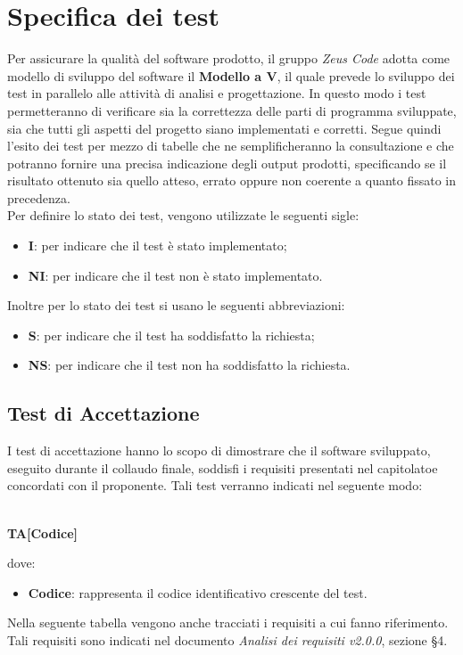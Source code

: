 \section{Specifica dei test}
Per assicurare la qualità del software prodotto, il gruppo \textit{Zeus Code} adotta come modello di sviluppo del software il
\textbf{Modello a V\glo}, il quale prevede lo sviluppo dei test in parallelo alle attività di analisi e progettazione. In questo modo i test permetteranno di verificare sia la correttezza delle parti di programma sviluppate, sia che tutti gli aspetti del progetto siano implementati e corretti. Segue quindi l'esito dei test per mezzo di tabelle che ne semplificheranno la consultazione e che potranno fornire una precisa indicazione degli output prodotti, specificando se il risultato ottenuto sia quello atteso, errato oppure non coerente a quanto fissato in precedenza. \\
Per definire lo stato dei test, vengono utilizzate le seguenti sigle:
\begin{itemize}
	\item \textbf{I}: per indicare che il test è stato implementato;
	\item \textbf{NI}: per indicare che il test non è stato implementato.
\end{itemize}
Inoltre per lo stato dei test si usano le seguenti abbreviazioni:
\begin{itemize}
	\item \textbf{S}: per indicare che il test ha soddisfatto la richiesta;
	\item \textbf{NS}: per indicare che il test non ha soddisfatto la richiesta.
\end{itemize}
\subsection{Test di Accettazione}
I test di accettazione hanno lo scopo di dimostrare che il software sviluppato, eseguito durante il collaudo finale, soddisfi i requisiti presentati nel capitolato\glosp e concordati con il proponente. Tali test verranno indicati nel seguente modo: \\ \\
	\centerline{\textbf{TA[Codice]}}
dove:
\begin{itemize}
	\item \textbf{Codice}: rappresenta il codice identificativo crescente del test.
\end{itemize}
	Nella seguente tabella vengono anche tracciati i requisiti a cui fanno riferimento. Tali requisiti sono indicati nel documento \textit{Analisi dei requisiti v2.0.0}, sezione §4.
	\renewcommand{\arraystretch}{1.5}
	
